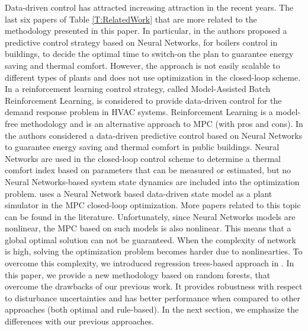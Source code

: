 {Data-driven control has attracted increasing attraction in the recent years.
The last six papers of Table \ref{T:RelatedWork} that are more related to the methodology presented in this paper.
In particular, in \cite{Macarulla2017} the authors proposed a predictive control strategy based on Neural Networks, for boilers control in buildings, to decide the optimal time to switch-on the plan to guarantee energy saving and thermal comfort.
However, the approach is not easily scalable to different types of plants and does not use optimization in the closed-loop scheme.
In \cite{Costanzo2016} a reinforcement learning control strategy, called Model-Assisted Batch Reinforcement Learning, is considered to provide data-driven control for the demand response problem in HVAC systems.
Reinforcement Learning is a model-free methodology and is an alternative approach to MPC \cite{Ernst2009TSMC} (with pros and cons).
In \cite{Ferreira2012} the authors considered a data-driven predictive control based on Neural Networks to guarantee energy saving and  thermal comfort in public buildings.
Neural Networks are used in the closed-loop control scheme to determine a thermal comfort index based on parameters that can be measured or estimated, but no Neural Networks-based system state dynamics are included into the optimization problem.
\cite{Afram2017} uses a Neural Network based data-driven state model as a plant simulator in the MPC closed-loop optimization.
More papers related to this topic can be found in the literature.
Unfortunately, since Neural Networks models are nonlinear, the MPC based on such models is also nonlinear.
This means that a global optimal solution can not be guaranteed. 
When the complexity of network is high, solving the optimization problem becomes harder due to nonlinearties.
To overcome this complexity, we introduced regression trees-based approach in \cite{Behl2016,Jain2017TCPS}.
In this paper, we provide a new methodology based on random forests, that overcome the drawbacks of our previous work.
It provides robustness with respect to disturbance uncertainties and has better performance when compared to other approaches (both optimal and rule-based).
In the next section, we emphasize the differences with our previous approaches.
}


